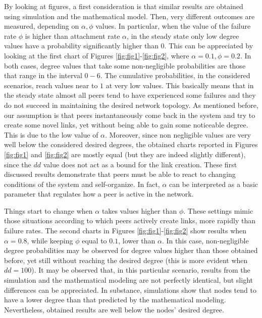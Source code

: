 \documentclass[a4paper,twosided]{article}
\begin{document}
By looking at figures, a first consideration is that similar results are obtained using simulation and the mathematical model. Then, very different outcomes are measured, depending on $\alpha,\phi$ values. In particular, when the value of the failure rate $\phi$ is higher than attachment rate $\alpha$, in the steady state only low degree values have a probability significantly higher than $0$. This can be appreciated by looking at the first chart of Figures \ref{fig:fig1}-\ref{fig:fig2}, where $\alpha=0.1, \phi=0.2$. 
In both cases, degree values that take some non-negligible probabilities are those that range in the interval $0-6$. The cumulative probabilities, in the considered scenarios, reach values near to $1$ at very low values. This basically means that in the steady state almost all peers tend to have experienced some failures and they do not succeed in maintaining the desired network topology. As mentioned before, our assumption is that peers instantaneously come back in the system and try to create some novel links, yet without being able to gain some noticeable degree. This is due to the low value of $\alpha$. Moreover, since non negligible values are very well below the considered desired degrees, the obtained charts reported in Figures \ref{fig:fig1} and \ref{fig:fig2}
are mostly equal (but they are indeed slightly different), since the $dd$ value does not act as a bound for the link creation. 
These first discussed results demonstrate that peers must be able to react to changing conditions of the system and self-orga\-ni\-ze. In fact, $\alpha$ can be interpreted as a basic parameter that regulates how a peer is active in the network.


Things start to change when $\alpha$ takes values higher than $\phi$. These settings mimic those situations according to which peers actively create links, more rapidly than failure rates. The second charts in Figures \ref{fig:fig1}-\ref{fig:fig2} show results when $\alpha=0.8$, while keeping $\phi$ equal to $0.1$, lower than $\alpha$. In this case, non-negligible degree probabilities may be observed for degree values higher than those obtained before, yet still without reaching the desired degree (this is more evident when $dd=100$). It may be observed that, in this particular scenario, results from the simulation and the mathematical modeling are not perfectly identical, but slight differences can be appreciated. In substance, simulations show that nodes tend to have a lower degree than that predicted by the mathematical modeling. Nevertheless, obtained results are well below the nodes' desired degree. 
\end{document}
